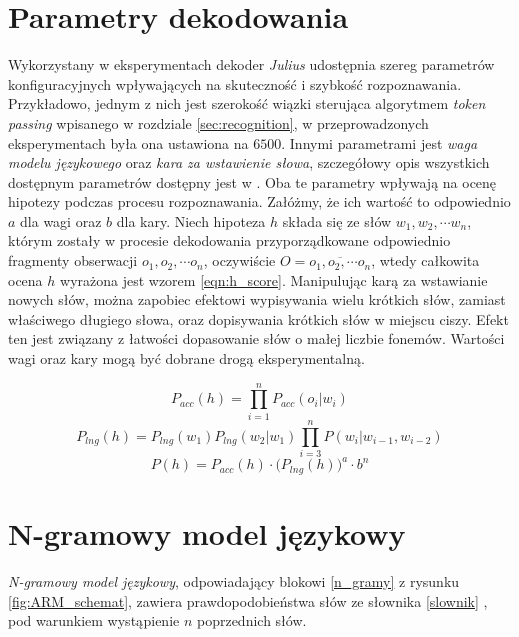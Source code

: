 \documentclass[11pt]{article}
\newcommand{\refBlock}[1]{%
	\hyperref[#1]{\ref*{#1}}%
}
\begin{document}
\section{Parametry dekodowania}
	\label{sec:meta_params}
	 	Wykorzystany w eksperymentach dekoder \textit{Julius} udostępnia szereg parametrów konfiguracyjnych wpływających na skuteczność i szybkość rozpoznawania. Przykładowo, jednym z nich jest szerokość wiązki sterująca algorytmem \textit{token passing} wpisanego w rozdziale \ref{sec:recognition}, w przeprowadzonych eksperymentach była ona ustawiona na $6500$. Innymi parametrami jest \textit{waga modelu językowego} oraz \textit{kara za wstawienie słowa}, szczegółowy opis wszystkich dostępnym parametrów dostępny jest w \cite{juliusbook}. Oba te parametry wpływają na ocenę hipotezy podczas procesu rozpoznawania. Załóżmy, że ich wartość to odpowiednio $a$ dla wagi oraz $b$ dla kary. Niech hipoteza $h$ składa się ze słów $w_1, w_2, \cdots w_n$, którym zostały w procesie dekodowania przyporządkowane odpowiednio fragmenty obserwacji $o_1, o_2, \cdots o_n$, oczywiście $O=\overline{o_1,o_2,\cdots o_n}$, wtedy całkowita ocena $h$ wyrażona jest wzorem \ref{eqn:h_score}. Manipulując karą za wstawianie nowych słów, można zapobiec efektowi wypisywania wielu krótkich słów, zamiast właściwego długiego słowa, oraz dopisywania krótkich słów w miejscu ciszy. Efekt ten jest związany z łatwości dopasowanie słów o małej liczbie fonemów.  Wartości wagi oraz kary mogą być dobrane drogą eksperymentalną.
	
		\begin{equation}
			P_{acc}(h) = \prod_{i=1}^n P_{acc}(o_i|w_i)
		\end{equation}
		\begin{equation}
			P_{lng}(h) = P_{lng}(w_1)P_{lng}(w_2|w_1)\prod_{i=3}^nP(w_i|w_{i-1},w_{i-2})
		\end{equation}
		\begin{equation}
			P(h) = P_{acc}(h) \cdot \bigg(P_{lng}(h)\bigg)^a \cdot b^n
		\label{eqn:h_score}
		\end{equation}
	
\section{N-gramowy model językowy}
	\label{sec:ngramm}
	\textit{N-gramowy model językowy}, odpowiadający blokowi \refBlock{n_gramy} z rysunku \ref{fig:ARM_schemat}, zawiera prawdopodobieństwa słów ze słownika \refBlock{slownik}, pod warunkiem wystąpienie $n$ poprzednich słów.
	
\end{document}
